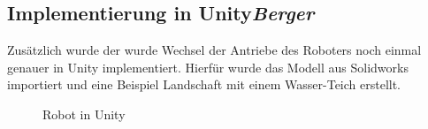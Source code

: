 \subsection{Implementierung in Unity\hfill\textnormal{\emph{Berger}}}
Zusätzlich wurde der wurde Wechsel der Antriebe des Roboters 
noch einmal genauer in Unity implementiert.
Hierfür wurde das Modell aus Solidworks importiert 
und eine Beispiel Landschaft mit einem Wasser-Teich erstellt.

\begin{figure}[H]
  \caption{Robot in Unity}
  \label{fig:unity1}
\end{figure}
